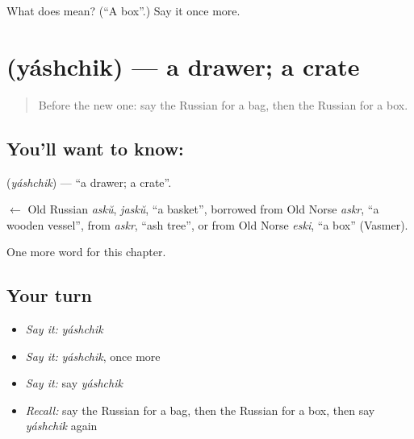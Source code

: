 \begin{tcolorbox}[breakable,colback=teal!4,colframe=teal!35!black,title={Before you move on}]
What does  mean? (\textquotedblleft{}A box\textquotedblright{}.) Say it once more.
\end{tcolorbox}
\section[\texorpdfstring{\ru{ящик} (yáshchik)}{ящик (yáshchik)}]{ (yáshchik) — a drawer; a crate}

\label{lesson:RU-C160-yashchik}



\begin{quote}
Before the new one: say the Russian for a bag, then the Russian for a box.
\end{quote}

\subsection*{You'll want to know: }
\textbf{} (\emph{yáshchik}) — \textquotedblleft{}a drawer; a crate\textquotedblright{}.

\begin{cousinweb}
\textbf{} $\leftarrow$ Old Russian \emph{askŭ}, \emph{jaskŭ}, \textquotedblleft{}a basket\textquotedblright{}, borrowed from Old Norse \emph{askr}, \textquotedblleft{}a wooden vessel\textquotedblright{}, from \emph{askr}, \textquotedblleft{}ash tree\textquotedblright{}, or from Old Norse \emph{eski}, \textquotedblleft{}a box\textquotedblright{} (Vasmer).
\end{cousinweb}

\begin{grammarlens}[title={What you've built}]
One more word for this chapter.
\end{grammarlens}

\subsection*{Your turn}
\begin{itemize}
\raggedright
  \item \emph{Say it:} \emph{yáshchik}
  \item \emph{Say it:} \emph{yáshchik}, once more
  \item \emph{Say it:} say \emph{yáshchik}
  \item \emph{Recall:} say the Russian for a bag, then the Russian for a box, then say \emph{yáshchik} again
\end{itemize}

